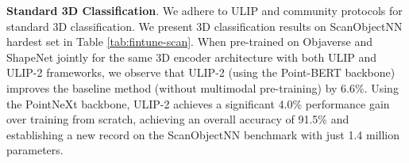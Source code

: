 \documentclass[10pt,twocolumn,letterpaper]{article}
\newcommand{\ning}[1]{\textcolor{blue}{Ning: #1}}
\newcommand{\cmark}{\ding{51}}
\newcommand{\xmark}{\ding{55}}
\begin{document}


\noindent\textbf{Standard 3D Classification}. We adhere to ULIP and community protocols for standard 3D classification. We present 3D classification results on ScanObjectNN hardest set in Table \ref{tab:fintune-scan}. When pre-trained on Objaverse and ShapeNet jointly for the same 3D encoder architecture with both ULIP and ULIP-2 frameworks, we observe that ULIP-2 (using the Point-BERT backbone) improves the baseline method (without multimodal pre-training) by 6.6\%. Using the PointNeXt backbone, ULIP-2 achieves a significant 4.0\% performance gain over training from scratch, achieving an overall accuracy of 91.5\% and establishing a new record on the ScanObjectNN benchmark with just 1.4 million parameters.
\end{document}
